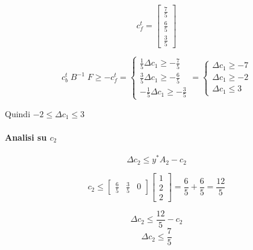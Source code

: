 \[
    c^t_f = 
    \begin{bmatrix}
        \frac 7 5 \\
        \frac 6 5 \\
        \frac 3 5
    \end{bmatrix}
\]

\[
    c^t_b \; B^{-1} \; F \geq - c^t_f = 
    \begin{cases}
        \frac 1 5 \Delta c_1 \geq - \frac 7 5 \\
        \frac 3 5 \Delta c_1 \geq - \frac 6 5 \\
        - \frac 1 5 \Delta c_1 \geq - \frac 3 5 
    \end{cases} = 
    \begin{cases}
        \Delta c_1 \geq -7 \\
        \Delta c_1 \geq -2 \\
        \Delta c_1 \leq 3
    \end{cases}
\]

Quindi $-2 \leq \Delta c_1 \leq 3$

\paragraph{Analisi su $c_2$}

\[
    \Delta c_2 \leq y^{*} A_2 - c_2
\]

\[
    c_2 \leq
    \begin{bmatrix}
        \frac 6 5 & \frac 3 5 & 0
    \end{bmatrix}
    \begin{bmatrix}
        1 \\ 2 \\ 2
    \end{bmatrix}
    = \frac 6 5 + \frac 6 5
    = \frac {12} 5
\]

\[
    \Delta c_2 \leq \frac {12} 5 - c_2
\]
\[
    \Delta c_2 \leq \frac 7 5
\]
